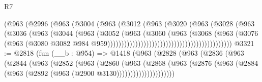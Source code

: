 \begin{lexlean}{R7}
\begin{coremodule}
                                              (@963
                                                (@2996
                                                  (@963
                                                    (@3004
                                                      (@963
                                                        (@3012
                                                          (@963
                                                            (@3020
                                                              (@963
                                                                (@3028
                                                                  (@963
                                                                    (@3036
                                                                      (@963
                                                                        (@3044
                                                                          (@963
                                                                            (@3052
                                                                              (@963
                                                                                (@3060
                                                                                  (@963
                                                                                    (@3068
                                                                                      (@963
                                                                                        (@3076
                                                                                          (@963
                                                                                            (@3080
                                                                                              @3082
                                                                                              @984
                                                                                              @959)))))))))))))))))))))))))))))))))))))))))))))
@3321 := @2818
    (fun (__b : @954) =>
    @1418
      (@963
        (@2828
          (@963
            (@2836
              (@963
                (@2844
                  (@963
                    (@2852
                      (@963
                        (@2860
                          (@963
                            (@2868
                              (@963
                                (@2876
                                  (@963 (@2884 (@963 (@2892 (@963 (@2900 @3130)))))))))))))))))))))

\end{coremodule}
\end{lexlean}
